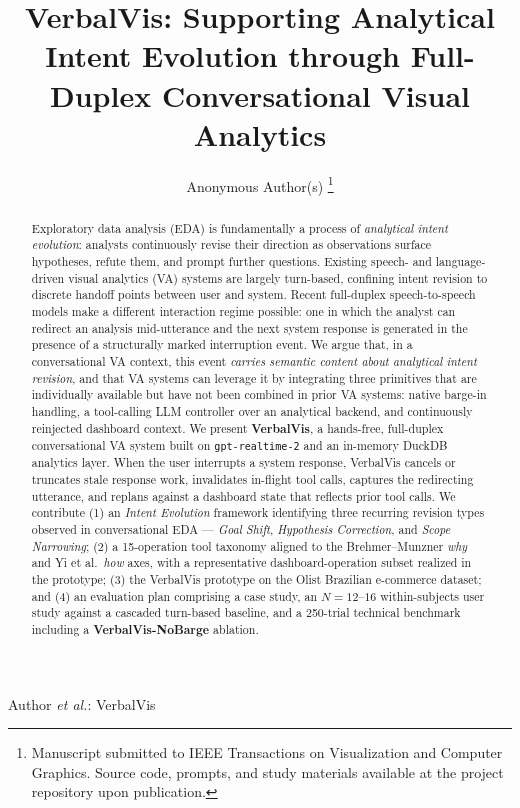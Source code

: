 \documentclass[journal]{IEEEtran}
\begin{document}
\title{VerbalVis: Supporting Analytical Intent Evolution through Full-Duplex Conversational Visual Analytics}

\author{Anonymous Author(s)%
\thanks{Manuscript submitted to IEEE Transactions on Visualization and Computer Graphics. Source code, prompts, and study materials available at the project repository upon publication.}}

%
{Author \MakeLowercase{\textit{et al.}}: VerbalVis}

\maketitle

\begin{abstract}
Exploratory data analysis (EDA) is fundamentally a process of \emph{analytical intent evolution}: analysts continuously revise their direction as observations surface hypotheses, refute them, and prompt further questions. Existing speech- and language-driven visual analytics (VA) systems are largely turn-based, confining intent revision to discrete handoff points between user and system. Recent full-duplex speech-to-speech models make a different interaction regime possible: one in which the analyst can redirect an analysis mid-utterance and the next system response is generated in the presence of a structurally marked interruption event. We argue that, in a conversational VA context, this event \emph{carries semantic content about analytical intent revision}, and that VA systems can leverage it by integrating three primitives that are individually available but have not been combined in prior VA systems: native barge-in handling, a tool-calling LLM controller over an analytical backend, and continuously reinjected dashboard context. We present \textbf{VerbalVis}, a hands-free, full-duplex conversational VA system built on \texttt{gpt-realtime-2} and an in-memory DuckDB analytics layer. When the user interrupts a system response, VerbalVis cancels or truncates stale response work, invalidates in-flight tool calls, captures the redirecting utterance, and replans against a dashboard state that reflects prior tool calls. We contribute (1) an \emph{Intent Evolution} framework identifying three recurring revision types observed in conversational EDA --- \emph{Goal Shift}, \emph{Hypothesis Correction}, and \emph{Scope Narrowing}; (2) a 15-operation tool taxonomy aligned to the Brehmer--Munzner \emph{why} and Yi et al.\ \emph{how} axes, with a representative dashboard-operation subset realized in the prototype; (3) the VerbalVis prototype on the Olist Brazilian e-commerce dataset; and (4) an evaluation plan comprising a case study, an $N{=}12$--$16$ within-subjects user study against a cascaded turn-based baseline, and a 250-trial technical benchmark including a \textbf{VerbalVis-NoBarge} ablation.
\end{abstract}
\end{document}
